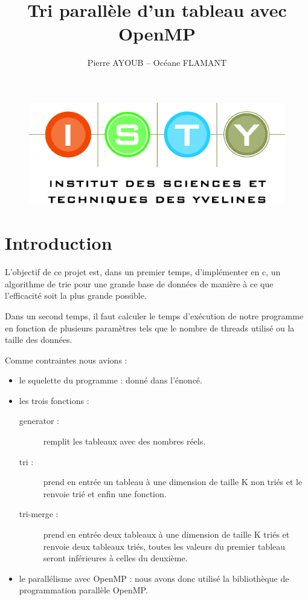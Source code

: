 \documentclass[12pt]{article}
\begin{document}
\title{Tri parallèle d'un tableau avec OpenMP}
\author{Pierre AYOUB -- Océane FLAMANT}

\maketitle

\begin{figure}[b]
    \centering
    \includegraphics[scale=0.3]{pictures/isty.jpg}
\end{figure}

\tableofcontents

\section{Introduction}
    
    L'objectif de ce projet est, dans un premier temps, d'implémenter en c, un algorithme de trie pour une grande base de données de manière à ce que l'efficacité soit la plus grande possible. 
    
    Dans un second temps, il faut calculer le temps d'exécution de notre programme en fonction de plusieurs paramètres tels que le nombre de threads utilisé ou la taille des données.

    Comme contraintes nous avions :
\begin{itemize}  
\item{le squelette du programme : donné dans l'énoncé.}
    
\item{les trois fonctions :
    \begin{description}
    \item[generator :] {remplit les tableaux avec des nombres réels.}
    \item[tri :] {prend en entrée un tableau à une dimension de taille K non triés et le renvoie trié et enfin une fonction.}
    \item[tri-merge :] {prend en entrée deux tableaux à une dimension de taille K triés et renvoie deux tableaux triés, toutes les valeurs du premier tableau seront inférieures à celles du deuxième.}
    \end{description}}
\item{le parallélisme avec OpenMP : nous avons donc utilisé la bibliothèque de programmation parallèle OpenMP.}
\end{itemize}
\end{document}
